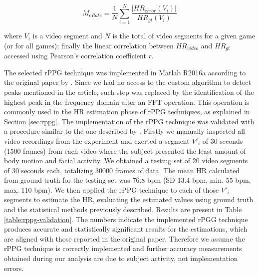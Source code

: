 \begin{equation}
\label{eqn:merate}
M_{eRate} = \frac{1}{N} \sum_{i=1}^{N}\frac{|HR_{error}(V_i)|}{HR_{gt}(V_i)}
\end{equation}

where $V_i$ is a video segment and $N$ is the total of video segments for a given game (or for all games); finally the linear correlation between $HR_{video}$ and $HR_{gt}$ accessed using Pearson's correlation coefficient $r$.


The selected rPPG technique was implemented in Matlab R2016a according to the original paper by \textcite{poh2011advancements}. Since we had no access to the custom algorithm to detect peaks mentioned in the article, such step was replaced by the identification of the highest peak in the frequency domain after an FFT operation. This operation is commonly used in the HR estimation phase of rPPG techniques, as explained in Section \ref{sec:rppg}.
The implementation of the rPPG technique was validated with a procedure similar to the one described by \textcite{li2014remote}. Firstly we manually inspected all video recordings from the experiment and exerted a segment $V'_i$ of 30 seconds (1500 frames) from each video where the subject presented the least amount of body motion and facial activity. We obtained a testing set of 20 video segments of 30 seconds each, totalizing 30000 frames of data. The mean HR calculated from ground truth for the testing set was 76.8 bpm (SD 13.4 bpm, min. 55 bpm, max. 110 bpm). We then applied the rPPG technique to each of those $V'_i$ segments to estimate the HR, evaluating the estimated values using ground truth and the statistical methods previously described. Results are present in Table \ref{table:rppg-validation}. The numbers indicate the implemented rPGG technique produces accurate and statistically significant results for the estimations, which are aligned with those reported in the original paper. Therefore we assume the rPPG technique is correctly implemented and further accuracy measurements obtained during our analysis are due to subject activity, not implementation errors.

\begin{table}
\label{table:rppg-validation}
\end{table}

